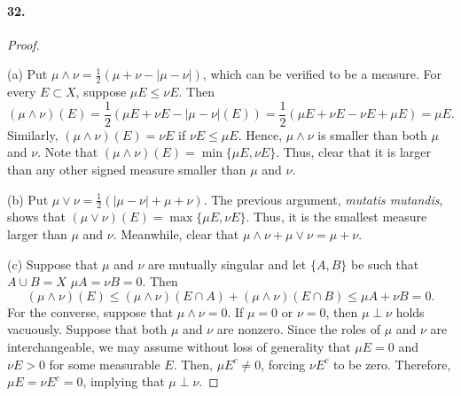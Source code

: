   \paragraph{32.}
  \begin{proof}
    $\,$\par
    (a) Put $\mu\wedge\nu=\frac{1}{2}(\mu+\nu-|\mu-\nu|)$, which can be 
    verified to be a measure. For every $E\subset X$, suppose $\mu E\le\nu E$. 
    Then
    \[
      (\mu\wedge\nu)(E)=
      \frac{1}{2}(\mu E+\nu E-|\mu-\nu|(E))=
      \frac{1}{2}(\mu E+\nu E-\nu E+\mu E)=
      \mu E.
    \]
    Similarly, $(\mu\wedge\nu)(E)=\nu E$ if $\nu E\le\mu E$. Hence, $\mu
    \wedge\nu$ is smaller than both $\mu$ and $\nu$. Note that $(\mu\wedge\nu)
    (E)=\min\{\mu E, \nu E\}$. Thus, clear that it is larger than any other
    signed measure smaller than $\mu$ and $\nu$.\par
    (b) Put $\mu\vee\nu=\frac{1}{2}(|\mu-\nu|+\mu+\nu)$. The previous argument,
    \textit{mutatis mutandis}, shows that $(\mu\vee\nu)(E)=\max\{\mu E,\nu E
    \}$. Thus, it is the smallest measure larger than $\mu$ and $\nu$. 
    Meanwhile, clear that $\mu\wedge\nu+\mu\vee\nu=\mu+\nu$.\par
    (c) Suppose that $\mu$ and $\nu$ are mutually singular and let $\{A,B\}$
    be such that $A\cup B=X$ $\mu A=\nu B=0$. Then
    \[
      (\mu\wedge\nu)(E)\le(\mu\wedge\nu)(E\cap A)+(\mu\wedge\nu)(E\cap B)
      \le\mu A+\nu B=0.
    \]
    For the converse, suppose that $\mu\wedge\nu=0$. If $\mu=0$ or $\nu=0$, 
    then $\mu\perp\nu$ holds vacuously. Suppose that both $\mu$ and $\nu$ are
    nonzero. Since the roles of $\mu$ and $\nu$ are interchangeable, we may
    assume without loss of generality that $\mu E=0$ and $\nu E>0$ for some
    measurable $E$. Then, $\mu E^c\ne 0$, forcing $\nu E^c$ to be zero. 
    Therefore, $\mu E=\nu E^c=0$, implying that $\mu\perp\nu$.
  \end{proof}












